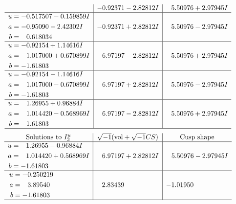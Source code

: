 \documentclass[1p]{elsarticle_modified}
\theoremstyle{definition}
\newcommand{\I}{\sqrt{-1}}
\begin{document}
$$\begin{array}{c|c|c}
 & -0.92371 - 2.82812 I & \phantom{-}5.50976 + 2.97945 I \\ \hline\begin{aligned}
u &= -0.517507 - 0.159859 I \\
a &= -0.95090 - 2.42302 I \\
b &= \phantom{-}0.618034\phantom{ +0.000000I}\end{aligned}
 & -0.92371 + 2.82812 I & \phantom{-}5.50976 - 2.97945 I \\ \hline\begin{aligned}
u &= -0.92154 + 1.14616 I \\
a &= \phantom{-}1.017000 + 0.670899 I \\
b &= -1.61803\phantom{ +0.000000I}\end{aligned}
 & \phantom{-}6.97197 - 2.82812 I & \phantom{-}5.50976 + 2.97945 I \\ \hline\begin{aligned}
u &= -0.92154 - 1.14616 I \\
a &= \phantom{-}1.017000 - 0.670899 I \\
b &= -1.61803\phantom{ +0.000000I}\end{aligned}
 & \phantom{-}6.97197 + 2.82812 I & \phantom{-}5.50976 - 2.97945 I \\ \hline\begin{aligned}
u &= \phantom{-}1.26955 + 0.96884 I \\
a &= \phantom{-}1.014420 - 0.568969 I \\
b &= -1.61803\phantom{ +0.000000I}\end{aligned}
 & \phantom{-}6.97197 - 2.82812 I & \phantom{-}5.50976 + 2.97945 I\\
 \hline 
 \end{array}$$\newpage$$\begin{array}{c|c|c}  
\text{Solutions to }I^u_{3}& \I (\text{vol} + \sqrt{-1}CS) & \text{Cusp shape}\\
 \hline 
\begin{aligned}
u &= \phantom{-}1.26955 - 0.96884 I \\
a &= \phantom{-}1.014420 + 0.568969 I \\
b &= -1.61803\phantom{ +0.000000I}\end{aligned}
 & \phantom{-}6.97197 + 2.82812 I & \phantom{-}5.50976 - 2.97945 I \\ \hline\begin{aligned}
u &= -0.250219\phantom{ +0.000000I} \\
a &= \phantom{-}3.89540\phantom{ +0.000000I} \\
b &= -1.61803\phantom{ +0.000000I}\end{aligned}
 & \phantom{-}2.83439\phantom{ +0.000000I} & -1.01950\phantom{ +0.000000I}\\
 \hline 
 \end{array}$$\newpage
\end{document}
